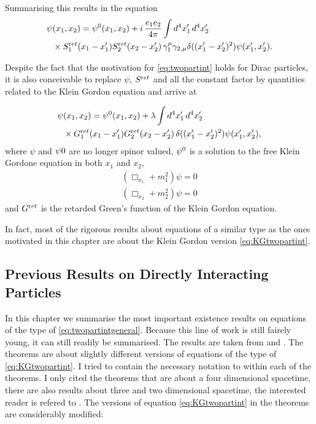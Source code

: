 \documentclass[b5paper,draft,openbib,12pt]{memoir}
\begin{document}
Summarising this results in the equation
\begin{align}\label{eq:twopartint}
  \psi&(x_1,x_2) = \psi^{0}(x_1,x_2)+i\, \frac{e_1e_2}{4\pi} \int d^4 x_1' \, d^4 x_2' \\\nonumber
  & \times S^{\textup ret}_1(x_1-x_1') S^{\textup ret}_2(x_2-x_2') \, \gamma_1^\mu \gamma_{2,\mu}\delta((x_1'-x_2')^2) \psi(x_1',x_2').
\end{align}


Despite the fact that the motivation for \eqref{eq:twopartint} holds for Dirac particles, 
it is also conceivable to replace \(\psi\), \(S^{\textup ret}\) and all the constant factor by 
quantities related to the Klein Gordon equation and arrive at 

\begin{align}\label{eq:KGtwopartint}
  \psi&(x_1,x_2) = \psi^{0}(x_1,x_2)+\lambda \int d^4 x_1' \, d^4 x_2' \\\nonumber
  & \times G^{\textup ret}_1(x_1-x_1') G^{\textup ret}_2(x_2-x_2') \,\delta((x_1'-x_2')^2) \psi(x_1',x_2'),
\end{align}
where \(\psi\) and \(\psi{0}\) are no longer spinor valued, \(\psi^{0}\) is a
solution to the free Klein Gordone equation in both \(x_1\) and \(x_2\),
\begin{align}
  (\Box_{x_1} + m_1^2)\psi=0\\
  (\Box_{x_2} + m_2^2)\psi=0
\end{align}
and \(G^{\textup ret}\) is the retarded Green's function of the Klein Gordon equation.

In fact,  most of the rigorous results about equations of a similar 
type as the ones motivated in this chapter are about the Klein 
Gordon version \eqref{eq:KGtwopartint}.


\subsection{Previous Results on Directly Interacting Particles}
In this chapter we summarise the most important existence results on equations of the type of 
\eqref{eq:twopartintgeneral}. Because this line of work is still fairely young,
it can still readily be summarised. The results are taken from \cite{lienertfirst} and 
\cite{lienertcurved}. The theorems are about slightly different versions of equations
of the type of \eqref{eq:KGtwopartint}. I tried to contain the necessary notation to within each
of the theorems. I only cited the theorems that are about a four dimensional spacetime, 
there are also results about three and two dimensional spacetime, the interested reader 
is refered to \cite{lienert2018direct,lienertcurved}. The versions of 
equation \eqref{eq:KGtwopartint} in the theorems are considerably modified:
\end{document}
